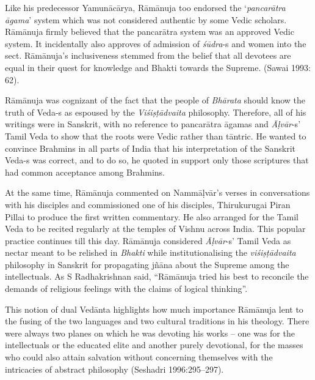 Like his predecessor Yamunācārya, Rāmānuja too endorsed the ‘\textit{pancarātra āgama}’ system which was not considered authentic by some Vedic scholars. Rāmānuja firmly believed that the pancarātra system was an approved Vedic system. It incidentally also approves of admission of \textit{śūdra}-s and women into the sect. Rāmānuja’s inclusiveness stemmed from the belief that all devotees are equal in their quest for knowledge and Bhakti towards the Supreme. (Sawai 1993: 62).

Rāmānuja was cognizant of the fact that the people of \textit{Bhārata} should know the truth of Veda-s as espoused by the \textit{Viśiṣṭādvaita} philosophy. Therefore, all of his writings were in Sanskrit, with no reference to pancarātra āgamas and \textit{Āḷvār}-s’ Tamil Veda to show that the roots were Vedic rather than tāntric. He wanted to convince Brahmins in all parts of India that his interpretation of the Sanskrit Veda-s was correct, and to do so, he quoted in support only those scriptures that had common acceptance among Brahmins.

At the same time, Rāmānuja commented on Nammāḷvār’s verses in conversations with his disciples and commissioned one of his disciples, Thirukurugai Piran Pillai to produce the first written commentary. He also arranged for the Tamil Veda to be recited regularly at the temples of Vishnu across India. This popular practice continues till this day. Rāmānuja considered \textit{Āḷvār}-s’ Tamil Veda as nectar meant to be relished in\textit{ Bhakti} while institutionalising the \textit{viśiṣṭādvaita} philosophy in Sanskrit for propagating jñāna about the Supreme among the intellectuals. As S Radhakrishnan said, “Rāmānuja tried his best to reconcile the demands of religious feelings with the claims of logical thinking”.

This notion of dual Vedānta highlights how much importance Rāmānuja lent to the fusing of the two languages and two cultural traditions in his theology. There were always two planes on which he was devoting his works – one was for the intellectuals or the educated elite and another purely devotional, for the masses who could also attain salvation without concerning themselves with the intricacies of abstract philosophy (Seshadri 1996:295–297).


